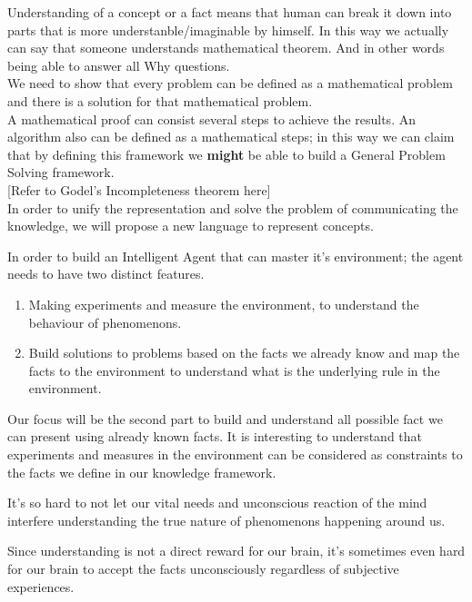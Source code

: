 \documentclass{article}
\begin{document}
Understanding of a concept or a fact means that human can break it down into parts that is more understanble/imaginable by himself. In this way we actually can say that someone understands mathematical theorem. And in other words being able to answer all Why questions.
\\

We need to show that every problem can be defined as a mathematical problem and there is a solution for that mathematical problem.\\

A mathematical proof can consist several steps to achieve the results. An algorithm also can be defined as a mathematical steps; in this way we can claim that by defining this framework we \textbf{might} be able to build a General Problem Solving framework.\\

[Refer to Godel's Incompleteness theorem here]\\


In order to unify the representation and solve the problem of communicating the knowledge, we will propose a new language to represent concepts.


In order to build an Intelligent Agent that can master it's environment; the agent needs to have two distinct features.

\begin{enumerate}
\item Making experiments and measure the environment, to understand the behaviour of phenomenons.
\item Build solutions to problems based on the facts we already know and map the facts to the environment to understand what is the underlying rule in the environment.
\end{enumerate}


Our focus will be the second part to build and understand all possible fact we can present using already known facts. It is interesting to understand that experiments and measures in the environment can be considered as constraints to the facts we define in our knowledge framework.


It’s so hard to not let our vital needs and unconscious reaction of the mind interfere understanding the true nature of phenomenons happening around us.

Since understanding is not a direct reward for our brain, it’s sometimes even hard for our brain to accept the facts unconsciously regardless of subjective experiences.
\end{document}
